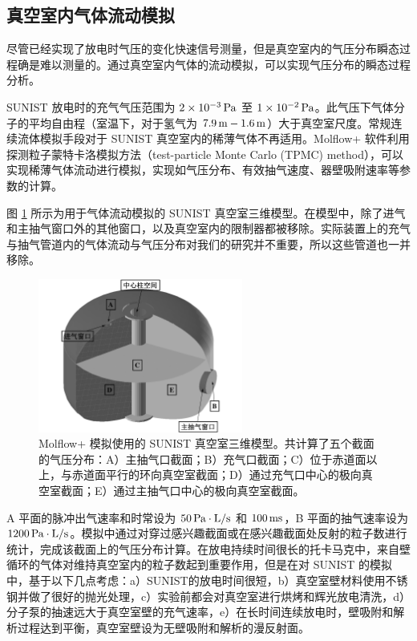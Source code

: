 \subsection{真空室内气体流动模拟}

尽管已经实现了放电时气压的变化快速信号测量，但是真空室内的气压分布瞬态过程确是难以测量的。通过真空室内气体的流动模拟，可以实现气压分布的瞬态过程分析。

SUNIST 放电时的充气气压范围为 $2\times10^{-3}\,{\rm Pa}$ 至 $1\times10^{-2}\,{\rm Pa}$。此气压下气体分子的平均自由程（室温下，对于氢气为 $7.9\,{\rm m}-1.6\,{\rm m}$）大于真空室尺度。常规连续流体模拟手段对于 SUNIST 真空室内的稀薄气体不再适用。Molflow+\cite{Molflow:paper,Molflow-url} 软件利用探测粒子蒙特卡洛模拟方法（test-particle Monte Carlo (TPMC) method），可以实现稀薄气体流动进行模拟，实现如气压分布、有效抽气速度、器壁吸附速率等参数的计算。



图 \ref{fig:chap04:vv-3d-model} 所示为用于气体流动模拟的 SUNIST 真空室三维模型。在模型中，除了进气和主抽气窗口外的其他窗口，以及真空室内的限制器都被移除。实际装置上的充气与抽气管道内的气体流动与气压分布对我们的研究并不重要，所以这些管道也一并移除。

\begin{figure}%
  \centering
  \includegraphics[width=0.6\textwidth]{moflow-vessel.pdf}
  \caption{Molflow+ 模拟使用的 SUNIST 真空室三维模型。共计算了五个截面的气压分布：A）主抽气口截面；B）充气口截面；C）位于赤道面以上，与赤道面平行的环向真空室截面；D）通过充气口中心的极向真空室截面；E）通过主抽气口中心的极向真空室截面。}
  \label{fig:chap04:vv-3d-model}
\end{figure}

A 平面的脉冲出气速率和时常设为 $50\,{\rm Pa}\cdot{\rm L}/{\rm s}$ 和 $100\,{\rm ms}$，B 平面的抽气速率设为 $1200\,{\rm Pa}\cdot{\rm L}/{\rm s}$。模拟中通过对穿过感兴趣截面或在感兴趣截面处反射的粒子数进行统计，完成该截面上的气压分布计算。在放电持续时间很长的托卡马克中，来自壁循环的气体对维持真空室内的粒子数起到重要作用，但是在对 SUNIST 的模拟中，基于以下几点考虑：a）SUNIST的放电时间很短，b）真空室壁材料使用不锈钢并做了很好的抛光处理，c）实验前都会对真空室进行烘烤和辉光放电清洗，d）分子泵的抽速远大于真空室壁的充气速率，e）在长时间连续放电时，壁吸附和解析过程达到平衡，真空室壁设为无壁吸附和解析的漫反射面。

